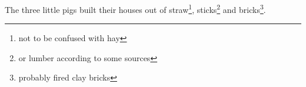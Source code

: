\documentclass{article}
\begin{document}
  \noindent The three little pigs built their houses
  out of straw\footnote{not to be confused with hay},
  sticks\footnote{or lumber according to some sources}
  and bricks\footnote{probably
  fired clay bricks}.
\end{document}
